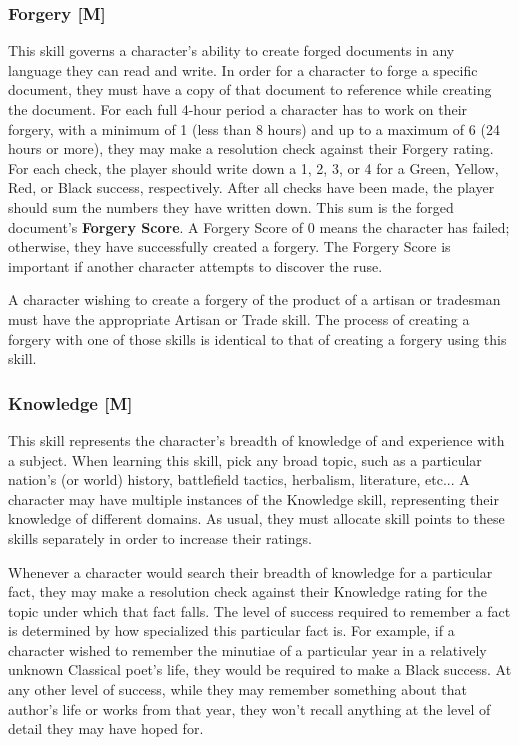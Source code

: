 \documentclass[oneside]{book}
\begin{document}
\begin{multicols}{2}
\subsubsection{Forgery [M]}
This skill governs a character's ability to create forged documents in any language they can read and write. In order for a character to forge a specific document, they must have a copy of that document to reference while creating the document. For each full 4-hour period a character has to work on their forgery, with a minimum of 1 (less than 8 hours) and up to a maximum of 6 (24 hours or more), they may make a resolution check against their Forgery rating. For each check, the player should write down a 1, 2, 3, or 4 for a Green, Yellow, Red, or Black success, respectively. After all checks have been made, the player should sum the numbers they have written down. This sum is the forged document's \textbf{Forgery Score}. A Forgery Score of 0 means the character has failed; otherwise, they have successfully created a forgery. The Forgery Score is important if another character attempts to discover the ruse.

A character wishing to create a forgery of the product of a artisan or tradesman must have the appropriate Artisan or Trade skill. The process of creating a forgery with one of those skills is identical to that of creating a forgery using this skill.

\subsubsection{Knowledge [M]}
This skill represents the character's breadth of knowledge of and experience with a subject. When learning this skill, pick any broad topic, such as a particular nation's (or world) history, battlefield tactics, herbalism, literature, etc... A character may have multiple instances of the Knowledge skill, representing their knowledge of different domains. As usual, they must allocate skill points to these skills separately in order to increase their ratings.

Whenever a character would search their breadth of knowledge for a particular fact, they may make a resolution check against their Knowledge rating for the topic under which that fact falls. The level of success required to remember a fact is determined by how specialized this particular fact is. For example, if a character wished to remember the minutiae of a particular year in a relatively unknown Classical poet's life, they would be required to make a Black success. At any other level of success, while they may remember something about that author's life or works from that year, they won't recall anything at the level of detail they may have hoped for.


\end{multicols}
\end{document}
